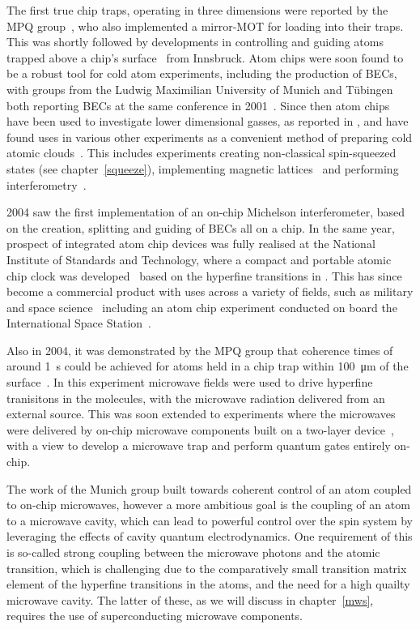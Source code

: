 The first true chip traps, operating in three dimensions were reported by the
MPQ group~\cite{Reichel1999}, who also implemented a mirror-MOT for loading
\esRb{} into their traps. This was shortly followed by developments in
controlling and guiding \Li{} atoms trapped above a chip's
surface~\cite{Folman2000} from Innsbruck.
%
Atom chips were soon found to be a robust tool for cold atom experiments,
including the production of BECs, with groups from the Ludwig Maximilian
University of Munich and T\"ubingen both reporting \esRb{} BECs at the same
conference in 2001~\cite{Hansel2001, Ott2001}. Since then atom chips have been
used to investigate lower dimensional gasses, as reported in
, and have found
uses in various other experiments as a convenient method of preparing cold
atomic clouds~\cite{PhysRevLett.104.073604}.
%
This includes experiments creating non-classical spin-squeezed states (see
chapter~\ref{squeeze}), implementing magnetic lattices~\cite{Gerritsma2007} and
performing interferometry~\cite{Wang2005}.

2004 saw the first implementation of an on-chip Michelson interferometer, based
on the creation, splitting and guiding of BECs all on a chip. In the same year,
prospect of integrated atom chip devices was fully realised at the National
Institute of Standards and Technology, where a compact and portable atomic chip
clock was developed~\cite{Knappe2004} based on the hyperfine transitions in
\Cs{}. This has since become a commercial product with uses across a variety of
fields, such as military and space science~\cite{RAMIREZMARTINEZ2011247}
including an atom chip experiment conducted on board the International Space
Station~\cite{Frye2021}.

Also in 2004, it was demonstrated by the MPQ group that coherence times of
around \SI{1}{\second} could be achieved for \esRb{} atoms held in a chip trap
within \SI{100}{\micro\meter} of the surface~\cite{Treutlein2004}. In this
experiment microwave fields were used to drive hyperfine tranisitons in the
molecules, with the microwave radiation delivered from an external source. This
was soon extended to experiments where the microwaves were delivered by on-chip
microwave components built on a two-layer device~\cite{Treutlein2008,
Boehi2009}, with a view to develop a microwave trap and perform quantum
gates entirely on-chip.

The work of the Munich group built towards coherent control of an atom coupled
to on-chip microwaves, however a more ambitious goal is the coupling of an atom
to a microwave cavity, which can lead to powerful control over the spin system
by leveraging the effects of cavity quantum electrodynamics. One requirement of
this is so-called strong coupling between the microwave photons and the atomic
transition, which is challenging due to the comparatively small transition
matrix element of the hyperfine transitions in the atoms, and the need for a
high quailty microwave cavity. The latter of these, as we will discuss in
chapter~\ref{mws}, requires the use of superconducting microwave components.

